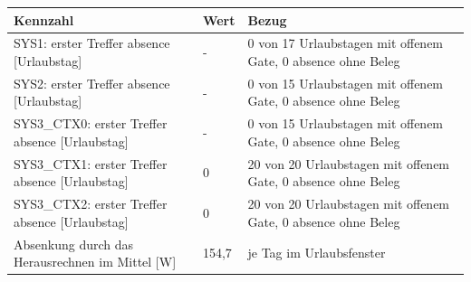 \begin{tabular}{lll}
\toprule
Kennzahl & Wert & Bezug \\
\midrule
SYS1: erster Treffer absence [Urlaubstag] & - & 0 von 17 Urlaubstagen mit offenem Gate, 0 \texttimes{} absence ohne Beleg \\
SYS2: erster Treffer absence [Urlaubstag] & - & 0 von 15 Urlaubstagen mit offenem Gate, 0 \texttimes{} absence ohne Beleg \\
SYS3\_CTX0: erster Treffer absence [Urlaubstag] & - & 0 von 15 Urlaubstagen mit offenem Gate, 0 \texttimes{} absence ohne Beleg \\
SYS3\_CTX1: erster Treffer absence [Urlaubstag] & 0 & 20 von 20 Urlaubstagen mit offenem Gate, 0 \texttimes{} absence ohne Beleg \\
SYS3\_CTX2: erster Treffer absence [Urlaubstag] & 0 & 20 von 20 Urlaubstagen mit offenem Gate, 0 \texttimes{} absence ohne Beleg \\
Absenkung durch das Herausrechnen im Mittel [W] & 154,7 & je Tag im Urlaubsfenster \\
\bottomrule
\end{tabular}

